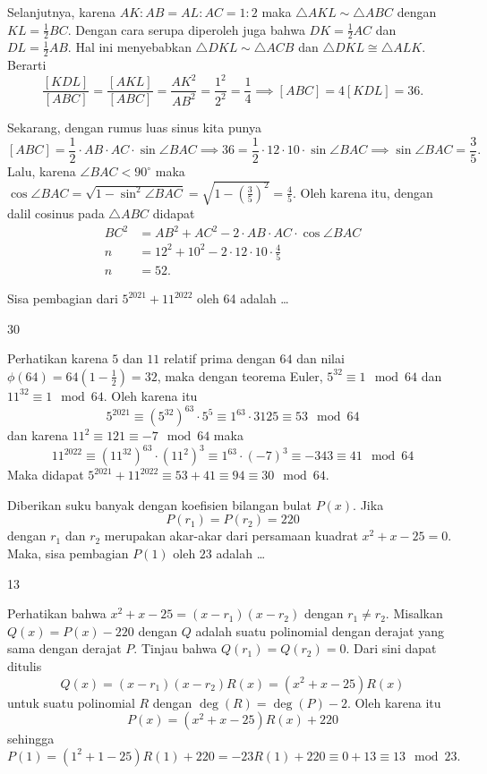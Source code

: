 \documentclass[12pt]{scrartcl}
\begin{document}
\begin{solusi}
Selanjutnya, karena $AK:AB=AL:AC=1:2$ maka $\triangle AKL \sim \triangle ABC$ dengan $KL=\frac{1}{2}BC$. Dengan cara serupa diperoleh juga bahwa $DK=\frac{1}{2}AC$ dan $DL=\frac{1}{2}AB$. Hal ini menyebabkan $\triangle DKL \sim \triangle ACB$ dan $\triangle DKL \cong \triangle ALK$. Berarti 
$$\dfrac{[KDL]}{[ABC]}=\dfrac{[AKL]}{[ABC]}=\dfrac{AK^2}{AB^2}=\dfrac{1^2}{2^2}=\dfrac{1}{4} \implies [ABC] = 4[KDL] = 36.$$

Sekarang, dengan rumus luas sinus kita punya
$$[ABC] = \dfrac{1}{2}\cdot AB \cdot AC \cdot \sin \angle BAC \implies 36=\dfrac{1}{2}\cdot 12 \cdot 10 \cdot \sin \angle BAC \implies \sin \angle BAC = \dfrac{3}{5}.$$
Lalu, karena $\angle BAC < 90^\circ$ maka $\cos \angle BAC = \sqrt{1-\sin^2 \angle BAC} = \sqrt{1 - (\frac{3}{5})^2} = \frac{4}{5}$. Oleh karena itu, dengan dalil cosinus pada $\triangle ABC$ didapat
\begin{align*}
BC^2 &= AB^2 + AC^2 -2\cdot AB \cdot AC \cdot \cos \angle BAC\\
n &= 12^2+10^2 - 2 \cdot 12 \cdot 10 \cdot \frac{4}{5}\\
n &= \boxed{52}.
\end{align*}
\end{solusi}

\begin{soalbaru}
Sisa pembagian dari $5^{2021}+11^{2022}$ oleh 64 adalah \dots
\end{soalbaru}
\begin{jawaban}
30
\end{jawaban}
\begin{solusi}
Perhatikan karena $5$ dan $11$ relatif prima dengan $64$ dan nilai $\phi(64) = 64(1-\frac{1}{2})=32$, maka dengan teorema Euler, $5^{32} \equiv 1 \mod 64$ dan $11^{32} \equiv 1 \mod 64$. Oleh karena itu
$$5^{2021} \equiv (5^{32})^{63} \cdot 5^5 \equiv 1^{63} \cdot 3125 \equiv 53 \mod 64$$
dan karena $11^2 \equiv 121 \equiv -7 \mod 64$ maka
$$11^{2022} \equiv (11^{32})^{63} \cdot (11^2)^3 \equiv 1^{63} \cdot (-7)^3 \equiv -343 \equiv 41 \mod 64$$
Maka didapat $5^{2021}+11^{2022} \equiv 53+41 \equiv 94 \equiv \boxed{30} \mod 64$.
\end{solusi}

\begin{soalbaru}
Diberikan suku banyak dengan koefisien bilangan bulat $P(x)$. Jika
$$P(r_1)=P(r_2)=220$$
dengan $r_1$ dan $r_2$ merupakan akar-akar dari persamaan kuadrat $x^2+x-25=0$. Maka, sisa pembagian $P(1)$ oleh $23$ adalah \dots
\end{soalbaru}
\begin{jawaban}
13
\end{jawaban}
\begin{solusi}
Perhatikan bahwa $x^2+x-25=(x-r_1)(x-r_2)$ dengan $r_1 \neq r_2$. Misalkan $Q(x) = P(x) - 220$ dengan $Q$ adalah suatu polinomial dengan derajat yang sama dengan derajat $P$. Tinjau bahwa $Q(r_1)=Q(r_2)=0$. Dari sini dapat ditulis
$$Q(x)=(x-r_1)(x-r_2)R(x)=(x^2+x-25)R(x)$$
untuk suatu polinomial $R$ dengan $\operatorname{deg}(R) = \operatorname{deg}(P)-2$. Oleh karena itu
$$P(x)=(x^2+x-25)R(x)+220$$ 
sehingga $$P(1) = (1^2+1-25)R(1) + 220 = -23R(1) + 220 \equiv 0 + 13 \equiv \boxed{13} \mod 23.$$
\end{solusi}
\end{document}
